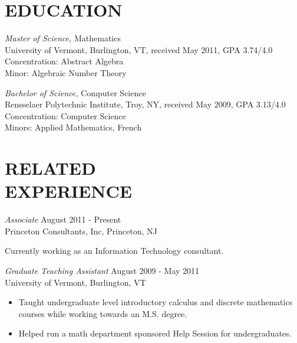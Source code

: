 \documentclass[line,margin]{res}
\begin{document}
\address{183A South Harrison Street}
\address{Princeton, NJ 08540}

\begin{resume}
  
  
  \section{EDUCATION} {\sl Master of Science,} Mathematics\\
  University of Vermont, Burlington, VT, 
  received May 2011, 
  GPA 3.74/4.0\\
  Concentration: Abstract Algebra\\
  Minor: Algebraic Number Theory

  {\sl Bachelor of Science,} Computer Science \\
  Rensselaer Polytechnic Institute, Troy, NY, 
  received May 2009,
  GPA 3.13/4.0\\
  Concentration: Computer Science \\
  Minors: Applied Mathematics, French\\

  \section{RELATED\\EXPERIENCE} 
  {\sl Associate} \hfill August 2011 - Present\\
  Princeton Consultants, Inc, Princeton, NJ
  
  Currently working as an Information Technology consultant.
  
  {\sl Graduate Teaching Assistant} \hfill August 2009 - May 2011 \\
  University of Vermont, Burlington, VT\\
  \begin{itemize}  \itemsep -2pt %
  \item
    Taught undergraduate level introductory calculus and discrete mathematics courses while working towards an M.S. degree.
  \item 
    Helped run a math department sponsored Help Session for undergraduates.
  \end{itemize}


\end{resume}
\end{document}
